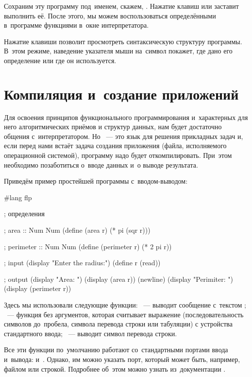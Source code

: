 Сохраним эту программу под~именем, скажем, . Нажатие клавиш  или  заставит  выполнить её. После этого, мы можем воспользоваться определёнными в~программе функциями в~окне интерпретатора.

Нажатие клавиши  позволит просмотреть синтаксическую структуру программы. В~этом режиме, наведение указателя мыши на~символ покажет, где дано его определение или где  он используется.


\section[4]{Компиляция и~создание приложений}\label{compilation}%
Для освоения принципов функционального программирования и~характерных для него алгоритмических приёмов и структур данных, нам будет достаточно общения с~интерпретатором. Но \Scheme~--- это язык для решения прикладных задач и, если перед нами встаёт задача создания приложения (файла, исполняемого операционной системой), программу надо будет откомпилировать. При~этом необходимо позаботиться о~вводе данных и~о выводе результата.

Приведём пример простейшей программы с~вводом-выводом:
\begin{Definition}[emph={r}]
#lang flp

; определения

; area :: Num \arrow Num
(define (area r)
  (* pi (sqr r)))

; perimeter :: Num \arrow Num
(define (perimeter r)
  (* 2 pi r))


; input
(display "Enter the radius:")
(define r (read))

; output
(display "Area: ")
(display (area r))
(newline)
(display "Perimiter: ")
(display (perimeter r))
\end{Definition}


Здесь мы использовали следующие функции: ~--- выводит сообщение с~текстом ; ~--- функция без аргументов, которая считывает выражение (последовательность символов до~пробела, символа перевода строки или табуляции) с устройства стандартного ввода; ~--- выводит символ перевода строки.

Все эти функции по~умолчанию работают со~стандартными портами ввода и~вывода:  и~. Однако, им можно указать порт, который может быть, например, файлом или строкой. Подробнее об~этом можно узнать из~документации .

